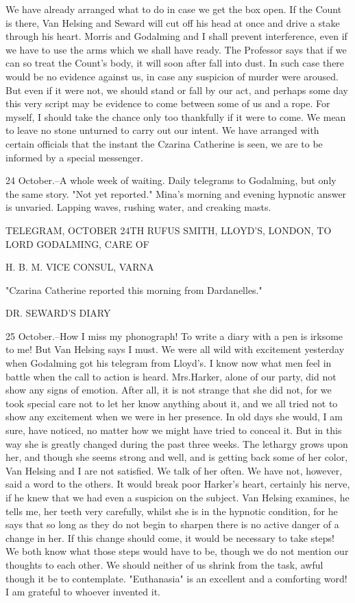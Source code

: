 We have already arranged what to do in case we get the box open. If the Count is there, Van Helsing and Seward will cut off his head at once and drive a stake through his heart. Morris and Godalming and I shall prevent interference, even if we have to use the arms which we shall have ready. The Professor says that if we can so treat the Count's body, it will soon after fall into dust. In such case there would be no evidence against us, in case any suspicion of murder were aroused. But even if it were not, we should stand or fall by our act, and perhaps some day this very script may be evidence to come between some of us and a rope. For myself, I should take the chance only too thankfully if it were to come. We mean to leave no stone unturned to carry out our intent. We have arranged with certain officials that the instant the Czarina Catherine is seen, we are to be informed by a special messenger. 

24 October.--A whole week of waiting. Daily telegrams to Godalming, but only the same story. "Not yet reported." Mina's morning and evening hypnotic answer is unvaried. Lapping waves, rushing water, and creaking masts. 

TELEGRAM, OCTOBER 24TH RUFUS SMITH, LLOYD'S, LONDON, TO LORD GODALMING, CARE OF 

H. B. M. VICE CONSUL, VARNA 

"Czarina Catherine reported this morning from Dardanelles." 

DR. SEWARD'S DIARY 

25 October.--How I miss my phonograph! To write a diary with a pen is irksome to me! But Van Helsing says I must. We were all wild with excitement yesterday when Godalming got his telegram from Lloyd's. I know now what men feel in battle when the call to action is heard. Mrs.Harker, alone of our party, did not show any signs of emotion. After all, it is not strange that she did not, for we took special care not to let her know anything about it, and we all tried not to show any excitement when we were in her presence. In old days she would, I am sure, have noticed, no matter how we might have tried to conceal it. But in this way she is greatly changed during the past three weeks. The lethargy grows upon her, and though she seems strong and well, and is getting back some of her color, Van Helsing and I are not satisfied. We talk of her often. We have not, however, said a word to the others. It would break poor Harker's heart, certainly his nerve, if he knew that we had even a suspicion on the subject. Van Helsing examines, he tells me, her teeth very carefully, whilst she is in the hypnotic condition, for he says that so long as they do not begin to sharpen there is no active danger of a change in her. If this change should come, it would be necessary to take steps! We both know what those steps would have to be, though we do not mention our thoughts to each other. We should neither of us shrink from the task, awful though it be to contemplate. "Euthanasia" is an excellent and a comforting word! I am grateful to whoever invented it. 

